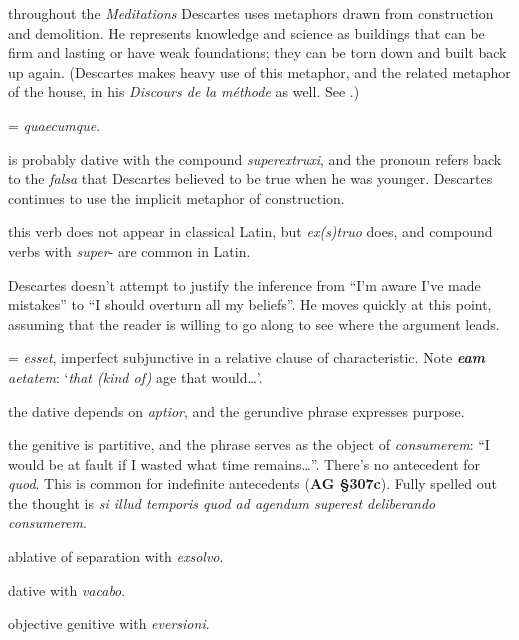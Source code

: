  throughout the \textit{Meditations} Descartes uses metaphors drawn from construction and demolition. He represents knowledge and science as buildings that can be firm and lasting or have weak foundations; they can be torn down and built back up again. (Descartes makes heavy use of this metaphor, and the related metaphor of the house, in his \textit{Discours de la méthode} as well. See \citet[22]{curtis1984}.)

 = \textit{quaecumque}.

 is probably dative with the compound \textit{superextruxi}, and the pronoun refers back to the \textit{falsa} that Descartes believed to be true when he was younger. Descartes continues to use the implicit metaphor of construction.

 this verb does not appear in classical Latin, but \textit{ex(s)truo} does, and compound verbs with \textit{super}- are common in Latin.

 Descartes doesn't attempt to justify the inference from ``I'm aware I've made mistakes'' to ``I should overturn all my beliefs''. He moves quickly at this point, assuming that the reader is willing to go along to see where the argument leads. 

 = \textit{esset}, imperfect subjunctive in a relative clause of characteristic. Note \textit{\textbf{eam} aetatem}: `\textit{that (kind of)} age that would\dots'.

 the dative depends on \textit{aptior}, and the gerundive phrase expresses purpose.

 the genitive is partitive, and the phrase serves as the object of \textit{consumerem}: ``I would be at fault if I wasted what time remains\dots''. There's no antecedent for \textit{quod}. This is common for indefinite antecedents (\textbf{AG §307c}). Fully spelled out the thought is \textit{si illud temporis quod ad agendum superest deliberando consumerem}.

 ablative of separation with \textit{exsolvo}.

 dative with \textit{vacabo}.

 objective genitive with \textit{eversioni}.


